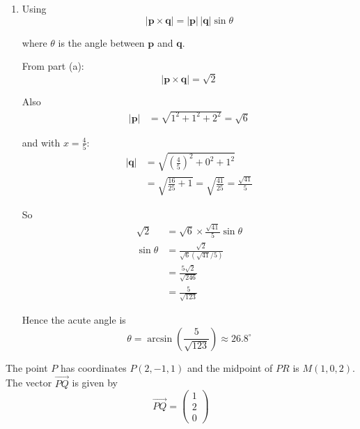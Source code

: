\documentclass[leqno]{article}
\begin{document}
\begin{enumerate}[
  label=\textbf{\arabic*.},
  leftmargin=*,
  topsep=0pt,
  partopsep=0pt,
  parsep=0pt
]
\begin{djsSolution}
\begin{enumerate}[label=\textbf{(\alph*)}]
This shows \(x\neq 0\), so the value \(x=0\) must be rejected.

Therefore
\[
x=\frac45
\]

Substitute into \(x(6-m)=2\):
\begin{align*}
\frac45(6-m)&=2 \\
6-m&=\frac{5}{2} \\
m&=6-\frac52=\frac72
\end{align*}

Therefore
\[
x=\frac45,\qquad m=\frac72
\]

  \item Using
\[
|\mathbf p\times \mathbf q|=|\mathbf p|\,|\mathbf q|\sin\theta
\]

where \(\theta\) is the angle between \(\mathbf p\) and \(\mathbf q\).

From part (a):
\[
|\mathbf p\times \mathbf q|=\sqrt2
\]

Also
\begin{align*}
|\mathbf p|
&=\sqrt{1^2+1^2+2^2}
=\sqrt6
\end{align*}

and with \(x=\frac45\):
\begin{align*}
|\mathbf q|
&=\sqrt{\left(\frac45\right)^2+0^2+1^2} \\
&=\sqrt{\frac{16}{25}+1}
=\sqrt{\frac{41}{25}}
=\frac{\sqrt{41}}{5}
\end{align*}

So
\begin{align*}
\sqrt2
&=\sqrt6\times \frac{\sqrt{41}}{5}\sin\theta \\
\sin\theta
&=\frac{\sqrt2}{\sqrt6(\sqrt{41}/5)} \\
&=\frac{5\sqrt2}{\sqrt{246}} \\
&=\frac{5}{\sqrt{123}}
\end{align*}

Hence the acute angle is
\[
\theta=\arcsin\left(\frac{5}{\sqrt{123}}\right)\approx 26.8^\circ
\]
\end{enumerate}
\end{djsSolution}


\newpage

\questionitem

The point $P$ has coordinates $P(2,-1,1)$ and the midpoint of $PR$ is $M(1,0,2)$. The vector $\overrightarrow{PQ}$ is given by
\[
\overrightarrow{PQ}=\begin{pmatrix}1\\2\\0\end{pmatrix}
\]


\end{enumerate}
\end{document}
